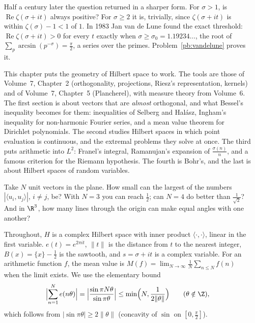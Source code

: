 Half a century later the question returned in a sharper form. For $\sigma>1$, is $\operatorname{Re}\zeta(\sigma+it)$ always positive?
For $\sigma\ge2$ it is, trivially, since $\zeta(\sigma+it)$ is within $\zeta(\sigma)-1<1$ of $1$. In 1983 Jan van de Lune found the
exact threshold: $\operatorname{Re}\zeta(\sigma+it)>0$ for every $t$ exactly when $\sigma\ge\sigma_0=1.19234\ldots$, the root of
$\sum_p\arcsin(p^{-\sigma})=\frac\pi2$, a series over the primes. Problem~\ref{pb:vandelune} proves it.

This chapter puts the geometry of Hilbert space to work. The tools are those of Volume~7, Chapter~2 (orthogonality, projections,
Riesz's representation, kernels) and of Volume~7, Chapter~5 (Plancherel), with measure theory from Volume~6. The first section is about
vectors that are \emph{almost} orthogonal, and what Bessel's inequality becomes for them: inequalities of Selberg and Halász,
Ingham's inequality for non-harmonic Fourier series, and a mean value theorem for Dirichlet polynomials. The second studies Hilbert
spaces in which point evaluation is continuous, and the extremal problems they solve at once. The third puts arithmetic into
$L^2$: Franel's integral, Ramanujan's expansion of $\frac{\sigma(n)}n$, and a famous criterion for the Riemann hypothesis. The fourth
is Bohr's, and the last is about Hilbert spaces of random variables.

\begin{think}
Take $N$ unit vectors in the plane. How small can the largest of the numbers $|\langle u_i,u_j\rangle|$, $i\ne j$, be? With $N=3$
you can reach $\frac12$; can $N=4$ do better than $\frac1{\sqrt2}$? And in $\R^3$, how many lines through the origin can make equal
angles with one another?
\end{think}

Throughout, $H$ is a complex Hilbert space with inner product $\langle\cdot,\cdot\rangle$, linear in the first variable. $e(t)=e^{2\pi it}$,
$\|t\|$ is the distance from $t$ to the nearest integer, $B(x)=\{x\}-\frac12$ is the sawtooth, and $s=\sigma+it$ is a complex variable.
For an arithmetic function $f$, the mean value is $M(f)=\lim_{N\to\infty}\frac1N\sum_{n\le N}f(n)$ when the limit exists. We use the
elementary bound
\begin{equation}\label{eq:dirichletkernel}
\Bigl|\sum_{n=1}^Ne(n\theta)\Bigr|=\Bigl|\frac{\sin\pi N\theta}{\sin\pi\theta}\Bigr|\le\min\Bigl(N,\frac1{2\|\theta\|}\Bigr)\qquad(\theta\notin\Z),
\end{equation}
which follows from $|\sin\pi\theta|\ge2\|\theta\|$ (concavity of $\sin$ on $[0,\frac\pi2]$).

